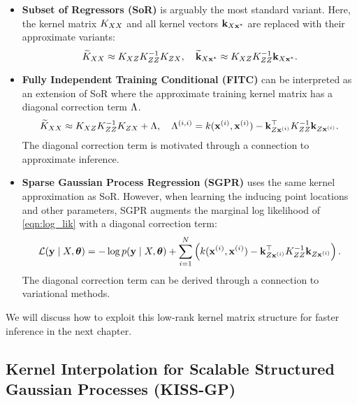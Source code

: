 \begin{itemize}
	\item {\bf Subset of Regressors (SoR)} \cite{silverman1985some,smola2001sparse} is arguably the most standard variant.
    Here, the kernel matrix $K_{XX}$ and all kernel vectors $\mathbf{k}_{X\mathbf{x}^*}$ are replaced with their approximate variants:
    \[ \widetilde {K}_{XX} \approx K_{XZ} K_{ZZ}^{-1} K_{ZX}, \quad
       \widetilde {\mathbf{k}}_{X\mathbf{x}^*} \approx K_{XZ} K_{ZZ}^{-1} \mathbf{k}_{X\mathbf{x}^*}. \]

	\item {\bf Fully Independent Training Conditional (FITC) } \cite{snelson2006sparse} can be interpreted as an extension of SoR
		where the approximate training kernel matrix has a diagonal correction term $\Lambda$.
    \[ \widetilde {K}_{XX} \approx K_{XZ} K_{ZZ}^{-1} K_{ZX} + \Lambda, \quad
       \Lambda^{(i,i)} = k(\mathbf{x}^{(i)}, \mathbf{x}^{(i)}) - \mathbf{k}_{Z\mathbf{x}^{(i)}}^\top K_{ZZ}^{-1} \mathbf{k}_{Z\mathbf{x}^{(i)}}. \]
    The diagonal correction term is motivated through a connection to approximate inference.

	\item {\bf Sparse Gaussian Process Regression (SGPR) } \cite{titsias2009variational} uses the same kernel approximation as SoR.
		However, when learning the inducing point locations and other parameters, SGPR augments the marginal log likelihood of \cref{eqn:log_lik} with a diagonal correction term:
    \[ \mathcal L(\mathbf{y} \mid X, \boldsymbol{\theta}) = -\log p(\mathbf{y} \mid X, \boldsymbol{\theta}) + \sum_{i=1}^N \left( k(\mathbf{x}^{(i)}, \mathbf{x}^{(i)}) - \mathbf{k}_{Z\mathbf{x}^{(i)}}^\top K_{ZZ}^{-1} \mathbf{k}_{Z\mathbf{x}^{(i)}} \right). \]
    The diagonal correction term can be derived through a connection to variational methods.
\end{itemize}
%
We will discuss how to exploit this low-rank kernel matrix structure for faster inference in the next chapter.


\subsection{Kernel Interpolation for Scalable Structured Gaussian Processes (KISS-GP)}
\label{sec:kissgp}

